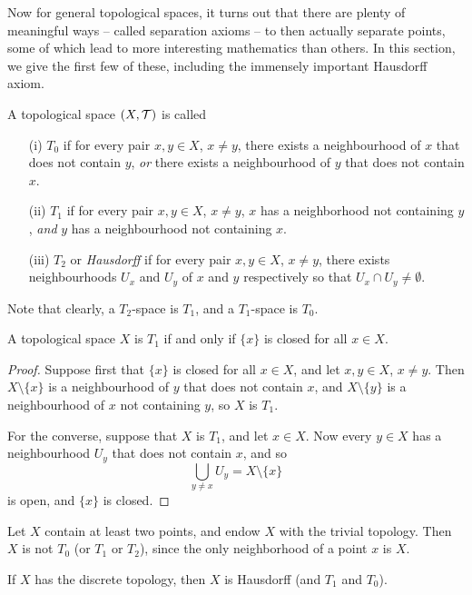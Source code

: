 Now for general topological spaces, it turns out that there are plenty of meaningful ways -- called separation axioms -- to then actually separate points, some of which lead to more interesting mathematics than others. In this section, we give the first few of these, including the immensely important Hausdorff axiom.
\begin{defn}
  A topological space $(X,\mathcal{T})$ is called
  \begin{enumerate}
    \item[(i)] $T_0$ if for every pair $x, y \in X$, $x \not= y$, there exists a neighbourhood of $x$ that does not contain $y$, \emph{or} there exists a neighbourhood of $y$ that does not contain $x$.
    \item[(ii)] $T_1$ if for every pair $x,y \in X$, $x \not= y$, $x$ has a neighborhood not containing $y$, \emph{and} $y$ has a neighbourhood not containing $x$.
    \item[(iii)] $T_2$ or \emph{Hausdorff} if for every pair $x, y \in X$, $x \not= y$, there exists neighbourhoods $U_x$ and $U_y$ of $x$ and $y$ respectively so that $U_x \cap U_y \not= \emptyset$.
  \end{enumerate}
\end{defn}
Note that clearly, a $T_2$-space is $T_1$, and a $T_1$-space is $T_0$.
\begin{prop}
  A topological space $X$ is $T_1$ if and only if $\{x \}$ is closed for all $x \in X$.
\end{prop}
\begin{proof}
  Suppose first that $\{x\}$ is closed for all $x \in X$, and let $x,y \in X$, $x \not= y$. Then $X \setminus \{x\}$ is a neighbourhood of $y$ that does not contain $x$, and $X \setminus \{y \}$ is a neighbourhood of $x$ not containing $y$, so $X$ is $T_1$.
  
  For the converse, suppose that $X$ is $T_1$, and let $x \in X$. Now every $y \in X$ has a neighbourhood $U_y$ that does not contain $x$, and so
  \[
    \bigcup_{y \not= x} U_y = X \setminus \{ x\}
  \]
  is open, and $\{x\}$ is closed.
\end{proof}
\begin{example}
  Let $X$ contain at least two points, and endow $X$ with the trivial topology. Then $X$ is not $T_0$ (or $T_1$ or $T_2$), since the only neighborhood of a point $x$ is $X$.
\end{example}
\begin{example}
  If $X$ has the discrete topology, then $X$ is Hausdorff (and $T_1$ and $T_0$).
\end{example}
